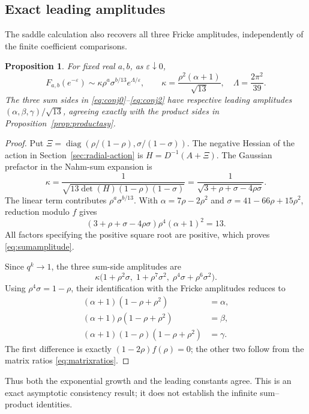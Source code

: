 \documentclass[11pt,reqno]{amsart}
\newtheorem{proposition}[theorem]{Proposition}
\theoremstyle{remark}
\numberwithin{equation}{section}
\begin{document}
\subsection{Exact leading amplitudes}\label{sec:amplitudes}
The saddle calculation also recovers all three Fricke amplitudes,
independently of the finite coefficient comparisons.
\begin{proposition}\label{prop:amplitudes}
For fixed real $a,b$, as $\varepsilon\downarrow0$,
\begin{equation}\label{eq:sumamplitude}
 F_{a,b}(e^{-\varepsilon})\sim
 \kappa\rho^a\sigma^{b/13}e^{\Lambda/\varepsilon},\qquad
 \kappa=\frac{\rho^2(\alpha+1)}{\sqrt{13}},\quad
 \Lambda=\frac{2\pi^2}{39}.
\end{equation}
The three sum sides in \eqref{eq:conj0}--\eqref{eq:conj2} have respective
leading amplitudes $(\alpha,\beta,\gamma)/\sqrt{13}$, agreeing exactly
with the product sides in Proposition~\ref{prop:productasy}.
\end{proposition}
\begin{proof}
Put $\Xi=\operatorname{diag}(\rho/(1-\rho),\sigma/(1-\sigma))$.
The negative Hessian of the action in Section~\ref{sec:radial-action}
is $H=D^{-1}(A+\Xi)$. The Gaussian prefactor in the Nahm-sum
expansion \cite[Section~2]{Mizuno} is
\[
 \kappa=\frac{1}{\sqrt{13\det(H)(1-\rho)(1-\sigma)}}
 =\frac{1}{\sqrt{3+\rho+\sigma-4\rho\sigma}}.
\]
The linear term contributes $\rho^a\sigma^{b/13}$. With
$\alpha=7\rho-2\rho^2$ and
$\sigma=41-66\rho+15\rho^2$, reduction modulo $f$ gives
\[
 (3+\rho+\sigma-4\rho\sigma)\rho^4(\alpha+1)^2=13.
\]
All factors specifying the positive square root are positive, which
proves \eqref{eq:sumamplitude}.

Since $q^k\to1$, the three sum-side amplitudes are
\[
 \kappa\bigl(1+\rho^2\sigma,\;
 1+\rho^7\sigma^2,\;
 \rho^4\sigma+\rho^6\sigma^2\bigr).
\]
Using $\rho^4\sigma=1-\rho$, their identification with the Fricke
amplitudes reduces to
\begin{align*}
 (\alpha+1)(1-\rho+\rho^2)&=\alpha,\\
 (\alpha+1)\rho(1-\rho+\rho^2)&=\beta,\\
 (\alpha+1)(1-\rho)(1-\rho+\rho^2)&=\gamma.
\end{align*}
The first difference is exactly $(1-2\rho)f(\rho)=0$; the other two
follow from the matrix ratios \eqref{eq:matrixratios}.
\end{proof}
Thus both the exponential growth and the leading constants agree.
This is an exact asymptotic consistency result; it does not establish
the infinite sum--product identities.
\end{document}
